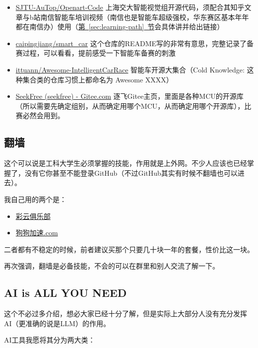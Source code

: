 \documentclass[a4paper,12pt]{article}
\begin{document}
\begin{itemize}
    \item \href{https://github.com/SJTU-AuTop/Openart-Code}{SJTU-AuTop/Openart-Code} 上海交大智能视觉组开源代码，须配合其知乎文章与b站南信智能车培训视频（南信也是智能车超级强校，华东赛区基本年年都在南信办）使用（\hyperref[sec:learning-path]{第~\ref*{sec:learning-path}~节}会具体讲并给出链接）
    \item \href{https://github.com/caipingjiang/smart_car}{caipingjiang/smart\_car} 这个仓库的README写的非常有意思，完整记录了备赛过程，可以看看，提前感受一下智能车备赛的刺激
    \item \href{https://github.com/ittuann/Awesome-IntelligentCarRace}{ittuann/Awesome-IntelligentCarRace} 智能车开源大集合（Cold Knowledge: 这种集合类的仓库习惯上都命名为 Awesome XXXX）
    \item \href{https://gitee.com/seekfree}{SeekFree (seekfree) - Gitee.com} 逐飞Gitee主页，里面是各种MCU的开源库（所以需要先确定组别，从而确定用哪个MCU，从而确定用哪个开源库），比赛必然会用到。
\end{itemize}

\subsection{翻墙}
\label{sec:vpn}

这个可以说是工科大学生必须掌握的技能，作用就是上外网。不少人应该也已经掌握了，没有它你甚至不能登录GitHub（不过GitHub其实有时候不翻墙也可以进去）。

我自己用的两个是：

\begin{itemize}
    \item \href{https://www.roosf.com/}{彩云俱乐部}
    \item \href{https://v.dg6.im/\#/register?code=oaxsAGo6}{狗狗加速.com}
\end{itemize}

二者都有不稳定的时候，前者建议买那个只要几十块一年的套餐，性价比这一块。

再次强调，翻墙是必备技能，不会的可以在群里和别人交流了解一下。

\subsection{AI is ALL YOU NEED}

这个不必过多介绍，想必大家已经十分了解，但是实际上大部分人没有充分发挥AI（更准确的说是LLM）的作用。

AI工具我愿将其分为两大类：
\end{document}
